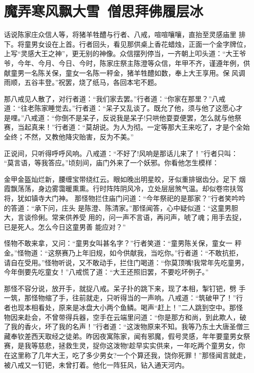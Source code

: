 \chapter{魔弄寒风飘大雪~僧思拜佛履层冰}

话说陈家庄众信人等，将猪羊牲醴与行者、八戒，喧喧嚷嚷，直抬至灵感庙里
排下。将童男女设在上首。行者回头，看见那供桌上香花蜡烛，正面一个金字牌位，
上写“灵感大王之神”，更无别的神像。众信摆列停当，一齐朝上叩头道：“大王爷
爷，今年、今月、今日、今时，陈家庄祭主陈澄等众信，年甲不齐，谨遵年例，供
献童男一名陈关保，童女一名陈一秤金，猪羊牲醴如数，奉上大王享用。保风调
雨顺，五谷丰登。”祝罢，烧了纸马，各回本宅不题。

那八戒见人散了，对行者道：“我们家去罢。”行者道：“你家在那里？”八戒
道：“往老陈家睡觉去。”行者道：“呆子又乱谈了。既允了他，须与他了这愿心才
是哩。”八戒道：“你倒不是呆子，反说我是呆子!只哄他耍耍便罢，怎么就与他祭
赛，当起真来！”行者道：“莫胡说。为人为彻。一定等那大王来吃了，才是个全始
全终；不然，又教他降灾贻害，反为不美。”

正说间，只听得呼呼风响。八戒道：“不好了!风响是那话儿来了！”行者只叫：
“莫言语，等我答应。”顷刻间，庙门外来了一个妖邪。你看他怎生模样：

金甲金盔灿烂新，腰缠宝带绕红云。眼如晚出明星皎，牙似重排锯齿分。足下
烟霞飘荡荡，身边雾霭暖熏熏。行时阵阵阴风冷，立处层层煞气温。却似卷帘扶驾
将，犹如镇寺大门神。
那怪物拦住庙门问道：“今年祭祀的是那家？”行者笑吟吟的答道：“承下问，庄头
是陈澄、陈清家。”那怪闻答，心中疑似道：“这童男胆大，言谈伶俐。常来供养受
用的，问一声不言语，再问声，唬了魂；用手去捉，已是死人。怎么今日这童男善
能应对？”

怪物不敢来拿，又问：“童男女叫甚名字？”行者笑道：“童男陈关保，童女一
秤金。”怪物道：“这祭赛乃上年旧规，如今供献我，当吃你。”行者道：“不敢抗拒，
请自在受用。”怪物听说，又不敢动手，拦住门喝道：“你莫顶嘴!我常年先吃童男，
今年倒要先吃童女！”八戒慌了道：“大王还照旧罢，不要吃坏例子。”

那怪不容分说，放开手，就捉八戒。呆子扑的跳下来，现了本相，掣钉钯，劈
手一筑，那怪物缩了手，往前就走，只听得当的一声响。八戒道：“筑破甲了！”行
者也现本相看处，原来是冰盘大小两个鱼鳞。喝声“赶上！”二人跳到空中。那怪
物因来赴会，不曾带得兵器，空手在云端里问道：“你是那方和尚，到此欺人，破
了我的香火，坏了我的名声！”行者道：“这泼物原来不知。我等乃东土大唐圣僧三
藏奉钦差西天取经之徒弟。昨因夜寓陈家，闻有邪魔，假号灵感，年年要童男女祭
赛，是我等慈悲，拯救生灵，捉你这泼物!趁早实实供来，一年吃两个童男女，你
在这里称了几年大王，吃了多少男女?一个个算还我，饶你死罪！”那怪闻言就走，
被八戒又一钉钯，未曾打着。他化一阵狂风，钻入通天河内。

